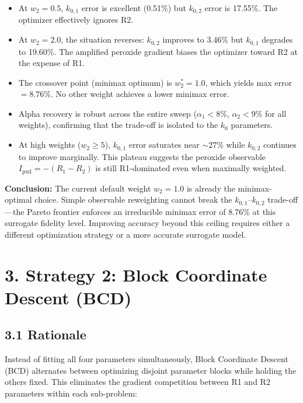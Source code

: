 \documentclass[11pt]{article}
\begin{document}
\begin{itemize}
  \item At $w_2 = 0.5$, $k_{0,1}$ error is excellent (0.51\%) but $k_{0,2}$
        error is 17.55\%.  The optimizer effectively ignores R2.

  \item At $w_2 = 2.0$, the situation reverses: $k_{0,2}$ improves to 3.46\%
        but $k_{0,1}$ degrades to 19.60\%.  The amplified peroxide gradient
        biases the optimizer toward R2 at the expense of R1.

  \item The crossover point (minimax optimum) is $w_2^* = 1.0$, which yields
        max error $= 8.76\%$.  No other weight achieves a lower minimax error.

  \item Alpha recovery is robust across the entire sweep ($\alpha_1 < 8\%$,
        $\alpha_2 < 9\%$ for all weights), confirming that the trade-off is
        isolated to the $k_0$ parameters.

  \item At high weights ($w_2 \geq 5$), $k_{0,1}$ error saturates near
        ${\sim}27\%$ while $k_{0,2}$ continues to improve marginally.  This
        plateau suggests the peroxide observable $I_{\text{pxd}} = -(R_1 - R_2)$
        is still R1-dominated even when maximally weighted.
\end{itemize}

\textbf{Conclusion:} The current default weight $w_2 = 1.0$ is already the
minimax-optimal choice.  Simple observable reweighting cannot break the
$k_{0,1}$--$k_{0,2}$ trade-off---the Pareto frontier enforces an irreducible
minimax error of 8.76\% at this surrogate fidelity level.  Improving accuracy
beyond this ceiling requires either a different optimization strategy or a more
accurate surrogate model.


\section*{3. Strategy 2: Block Coordinate Descent (BCD)}

\subsection*{3.1 Rationale}

Instead of fitting all four parameters simultaneously, Block Coordinate Descent
(BCD) alternates between optimizing disjoint parameter blocks while holding the
others fixed.  This eliminates the gradient competition between R1 and R2
parameters within each sub-problem:
\end{document}
